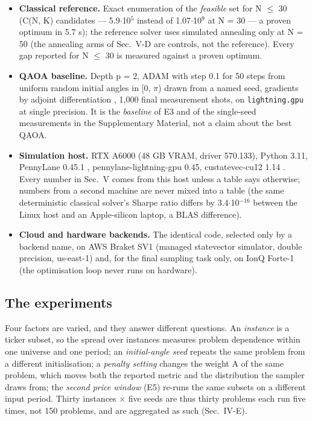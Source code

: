 \documentclass{ieeeaccess}
\begin{document}
\begin{itemize}
\item \textbf{Classical reference.} Exact enumeration of the \textit{feasible} set for N $\leq$ 30 (C(N, K) candidates --- 5.9$\cdot$10$^{5}$ instead of 1.07$\cdot$10$^{9}$ at N = 30 --- a proven optimum in 5.7 s); the reference solver uses simulated annealing \cite{ref41} only at N = 50 (the annealing arms of Sec.~V-D are controls, not the reference). Every gap reported for N $\leq$ 30 is measured against a proven optimum.
\item \textbf{QAOA baseline.} Depth p = 2, ADAM \cite{ref42} with step 0.1 for 50 steps from uniform random initial angles in [0, $\pi$) drawn from a named seed, gradients by adjoint differentiation \cite{ref37}, 1,000 final measurement shots, on \texttt{lightning.gpu} at single precision. It is the \textit{baseline} of E3 and of the single-seed measurements in the Supplementary Material, not a claim about the best QAOA.
\item \textbf{Simulation host.} RTX A6000 (48 GB VRAM, driver 570.133), Python 3.11, PennyLane 0.45.1 \cite{ref35}, pennylane-lightning-gpu 0.45, custatevec-cu12 1.14 \cite{ref36}. Every number in Sec.~V comes from this host unless a table says otherwise; numbers from a second machine are never mixed into a table (the same deterministic classical solver's Sharpe ratio differs by 3.4$\cdot$10$^{-16}$ between the Linux host and an Apple-silicon laptop, a BLAS difference).
\item \textbf{Cloud and hardware backends.} The identical code, selected only by a backend name, on AWS Braket SV1 (managed statevector simulator, double precision, us-east-1) and, for the final sampling task only, on IonQ Forte-1 (the optimisation loop never runs on hardware).
\end{itemize}


\subsection{The experiments}


Four factors are varied, and they answer different questions. An \textit{instance} is a ticker subset, so the spread over instances measures problem dependence within one universe and one period; an \textit{initial-angle seed} repeats the same problem from a different initialisation; a \textit{penalty setting} changes the weight A of the same problem, which moves both the reported metric and the distribution the sampler draws from; the \textit{second price window} (E5) re-runs the same subsets on a different input period. Thirty instances $\times$ five seeds are thus thirty problems each run five times, not 150 problems, and are aggregated as such (Sec.~IV-E).
\end{document}
